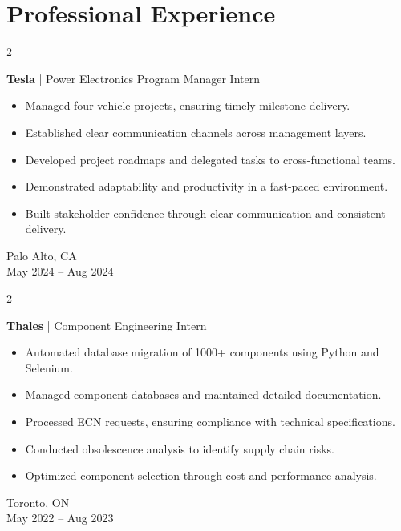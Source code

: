 \documentclass[10pt, letterpaper]{article}
\newenvironment{highlights}{
    \begin{itemize}[
        topsep=0.10 cm,
        parsep=0.10 cm,
        partopsep=0pt,
        itemsep=0pt,
        leftmargin=0.4 cm + 10pt
    ]
}{
    \end{itemize}
} %
\newenvironment{twocolentry}[2][]{
    \onecolentry
    \def\secondColumn{#2}
    \setcolumnwidth{\fill, 4.5 cm}
    \begin{paracol}{2}
}{
    \switchcolumn \raggedleft \secondColumn
    \end{paracol}
    \endonecolentry
} %
\begin{document}
    \section{Professional Experience}
        \begin{twocolentry}{Palo Alto, CA \\ May 2024 – Aug 2024}
            \textbf{Tesla} | Power Electronics Program Manager Intern
            \begin{highlights}
                \item Managed four vehicle projects, ensuring timely milestone delivery.
                \item Established clear communication channels across management layers.
                \item Developed project roadmaps and delegated tasks to cross-functional teams.
                \item Demonstrated adaptability and productivity in a fast-paced environment.
                \item Built stakeholder confidence through clear communication and consistent delivery.
            \end{highlights}
        \end{twocolentry}

        \vspace{0.2 cm}

        \begin{twocolentry}{Toronto, ON \\ May 2022 – Aug 2023}
            \textbf{Thales} | Component Engineering Intern
            \begin{highlights}
                \item Automated database migration of 1000+ components using Python and Selenium.
                \item Managed component databases and maintained detailed documentation.
                \item Processed ECN requests, ensuring compliance with technical specifications.
                \item Conducted obsolescence analysis to identify supply chain risks.
                \item Optimized component selection through cost and performance analysis.
            \end{highlights}
        \end{twocolentry}
\end{document}
